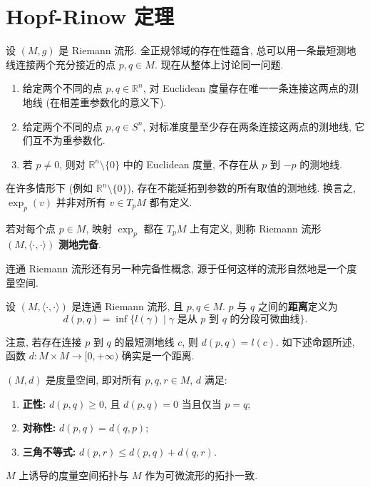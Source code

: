 \section{Hopf-Rinow 定理}\label{sec:hopf-rinow-theorem}

设 $(M,g)$ 是 Riemann 流形. 全正规邻域的存在性蕴含, 总可以用一条最短测地线连接两个充分接近的点 $p,q\in M$. 现在从整体上讨论同一问题.

\begin{RiemannExample}\label{ex:global-geodesics-of-euclidean-space-and-sphere}
\begin{enumerate}[label=(\arabic*),leftmargin=*]
\item 给定两个不同的点 $p,q\in\mathbb{R}^n$, 对 Euclidean 度量存在唯一一条连接这两点的测地线 (在相差重参数化的意义下).
\item 给定两个不同的点 $p,q\in S^n$, 对标准度量至少存在两条连接这两点的测地线, 它们互不为重参数化.
\item 若 $p\ne0$, 则对 $\mathbb{R}^n\setminus\{0\}$ 中的 Euclidean 度量, 不存在从 $p$ 到 $-p$ 的测地线.
\end{enumerate}
\end{RiemannExample}

在许多情形下 (例如 $\mathbb{R}^n\setminus\{0\}$), 存在不能延拓到参数的所有取值的测地线. 换言之, $\exp_p(v)$ 并非对所有 $v\in T_pM$ 都有定义.

\begin{RiemannDefinition}\label{def:geodesic-completeness}
若对每个点 $p\in M$, 映射 $\exp_p$ 都在 $T_pM$ 上有定义, 则称 Riemann 流形 $(M,\langle\cdot,\cdot\rangle)$ \textbf{测地完备}.
\end{RiemannDefinition}

连通 Riemann 流形还有另一种完备性概念, 源于任何这样的流形自然地是一个度量空间.

\begin{RiemannDefinition}\label{def:riemannian-distance}
设 $(M,\langle\cdot,\cdot\rangle)$ 是连通 Riemann 流形, 且 $p,q\in M$. $p$ 与 $q$ 之间的\textbf{距离}定义为
\[
  d(p,q)=\inf\{l(\gamma)\mid\text{$\gamma$ 是从 $p$ 到 $q$ 的分段可微曲线}\}.
\]
\end{RiemannDefinition}

注意, 若存在连接 $p$ 到 $q$ 的最短测地线 $c$, 则 $d(p,q)=l(c)$. 如下述命题所述, 函数 $d:M\times M\to[0,+\infty)$ 确实是一个距离.

\begin{RiemannProposition}\label{prop:riemannian-distance-defines-metric-topology}
$(M,d)$ 是度量空间, 即对所有 $p,q,r\in M$, $d$ 满足:
\begin{enumerate}[label=(\roman*),leftmargin=*]
\item \textbf{正性:} $d(p,q)\geq0$, 且 $d(p,q)=0$ 当且仅当 $p=q$;
\item \textbf{对称性:} $d(p,q)=d(q,p)$;
\item \textbf{三角不等式:} $d(p,r)\leq d(p,q)+d(q,r)$.
\end{enumerate}
$M$ 上诱导的度量空间拓扑与 $M$ 作为可微流形的拓扑一致.
\end{RiemannProposition}

